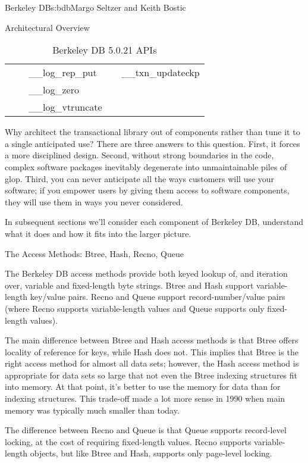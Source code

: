 \begin{aosachapter}{Berkeley DB}{s:bdb}{Margo Seltzer and Keith Bostic}
\begin{aosasect1}{Architectural Overview}
\begin{table}[t]
\begin{tabular}[c] { | l | l | l | l | l | }
              &                & \_\_log\_rep\_put          &                          & \_\_txn\_updateckp \\
              &                & \_\_log\_zero             &                          &  \\
              &                & \_\_log\_vtruncate        &                          &  \\
\hline
\end{tabular}
\caption{Berkeley DB 5.0.21 APIs}
\label{tbl.bdb.apitab}
\end{table}

Why architect the transactional library out of components rather than
tune it to a single anticipated use? There are three answers to this
question. First, it forces a more disciplined design. Second, without
strong boundaries in the code, complex software packages inevitably
degenerate into unmaintainable piles of glop. Third, you can never
anticipate all the ways customers will use your software; if you
empower users by giving them access to software components, they will
use them in ways you never considered.

In subsequent sections we'll consider each component of Berkeley DB,
understand what it does and how it fits into the larger picture.

\end{aosasect1}

\begin{aosasect1}{The Access Methods: Btree, Hash, Recno, Queue}

The Berkeley DB access methods provide both keyed lookup of, and
iteration over, variable and fixed-length byte strings.  Btree and
Hash support variable-length key/value pairs. Recno and Queue support
record-number/value pairs (where Recno supports variable-length values
and Queue supports only fixed-length values).

\pagebreak

The main difference between Btree and Hash access methods is that
Btree offers locality of reference for keys, while Hash does not. This
implies that Btree is the right access method for almost all data sets;
however, the Hash access method is appropriate for data sets so large
that not even the Btree indexing structures fit into memory. At that
point, it's better to use the memory for data than for indexing
structures. This trade-off made a lot more sense in 1990 when main
memory was typically much smaller than today.

The difference between Recno and Queue is that Queue supports
record-level locking, at the cost of requiring fixed-length values.
Recno supports variable-length objects, but like Btree and Hash,
supports only page-level locking.


\end{aosasect1}
\end{aosachapter}
